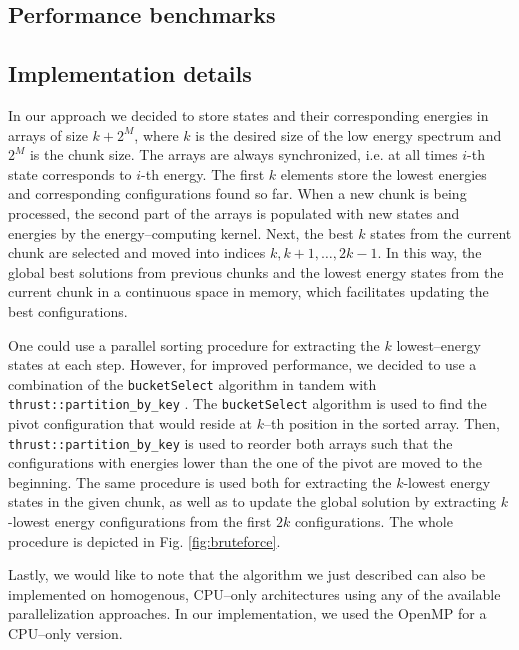 \subsection{Performance benchmarks}

\subsection{Implementation details}

In our approach we decided to store states and their corresponding energies in
arrays of size $k+2^{M}$, where $k$ is the desired size of the low energy
spectrum and $2^{M}$ is the chunk size. The arrays are always synchronized,
i.e. at all times $i$-th state corresponds to $i$-th energy. The first $k$
elements store the lowest energies and corresponding configurations found so
far. When a new chunk is being processed, the second part of the arrays is
populated with new states and energies by the energy--computing kernel. Next,
the best $k$ states from the current chunk are selected and moved into indices
$k, k+1,\ldots,2k-1$. In this way, the global best solutions from previous
chunks and the lowest energy states from the current chunk in a continuous
space in memory, which facilitates updating the best configurations.

One could use a parallel sorting procedure for extracting the $k$
lowest--energy states at each step. However, for improved performance, we
decided to use a combination of the \texttt{bucketSelect} \cite{bucketselect}
algorithm in tandem with \texttt{thrust::partition\_by\_key} \cite{thrust}. The
\texttt{bucketSelect} algorithm is used to find the pivot configuration that
would reside at $k$--th position in the sorted array. Then,
\texttt{thrust::partition\_by\_key} is used to reorder both arrays such that
the configurations with energies lower than the one of the pivot are moved to
the beginning. The same procedure is used both for extracting the $k$-lowest
energy states in the given chunk, as well as to update the global solution by
extracting $k$-lowest energy configurations from the first $2k$ configurations.
The whole procedure is depicted in Fig. \ref{fig:bruteforce}.

Lastly, we would like to note that the algorithm we just described can also be
implemented on homogenous, CPU--only architectures using any of the available
parallelization approaches. In our implementation, we used the
OpenMP\cite{openmp} for a CPU--only version.

